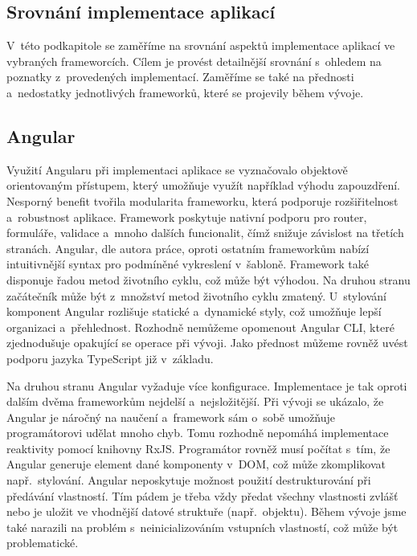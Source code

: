 \newpage




\subsection{Srovnání implementace aplikací}

V~této podkapitole se zaměříme na srovnání aspektů implementace aplikací ve vybraných frameworcích. 
Cílem je provést detailnější srovnání s~ohledem na poznatky z~provedených implementací. 
Zaměříme se také na přednosti a~nedostatky jednotlivých frameworků, které se projevily během vývoje.

\subsection*{Angular}

Využití Angularu při implementaci aplikace se vyznačovalo objektově orientovaným přístupem, který umožňuje využít například výhodu zapouzdření. 
Nesporný benefit tvořila modularita frameworku, která podporuje rozšiřitelnost a~robustnost aplikace. 
Framework poskytuje nativní podporu pro router, formuláře, validace a~mnoho dalších funcionalit, čímž snižuje závislost na třetích stranách. 
Angular, dle autora práce, oproti ostatním frameworkům nabízí intuitivnější syntax pro podmíněné vykreslení v~šabloně. 
Framework také disponuje řadou metod životního cyklu, což může být výhodou. Na druhou stranu začátečník může být z~množství metod životního cyklu zmatený. 
U~stylování komponent Angular rozlišuje statické a~dynamické styly, což umožňuje lepší organizaci a~přehlednost. 
Rozhodně nemůžeme opomenout Angular CLI, které zjednodušuje opakující se operace při vývoji. 
Jako přednost můžeme rovněž uvést podporu jazyka TypeScript již v~základu. 

Na druhou stranu Angular vyžaduje více konfigurace. Implementace je tak oproti dalším dvěma frameworkům nejdelší a~nejsložitější. 
Při vývoji se ukázalo, že Angular je náročný na naučení a~framework sám o~sobě umožňuje programátorovi udělat mnoho chyb. 
Tomu rozhodně nepomáhá implementace reaktivity pomocí knihovny RxJS. 
Programátor rovněž musí počítat s~tím, že Angular generuje element dané komponenty v~DOM, což může zkomplikovat např.~stylování. 
Angular neposkytuje možnost použití destrukturování při předávání vlastností. 
Tím pádem je třeba vždy předat všechny vlastnosti zvlášť nebo je uložit ve vhodnější datové struktuře (např.~objektu).
Během vývoje jsme také narazili na problém s~neinicializováním vstupních vlastností, což může být problematické. 


